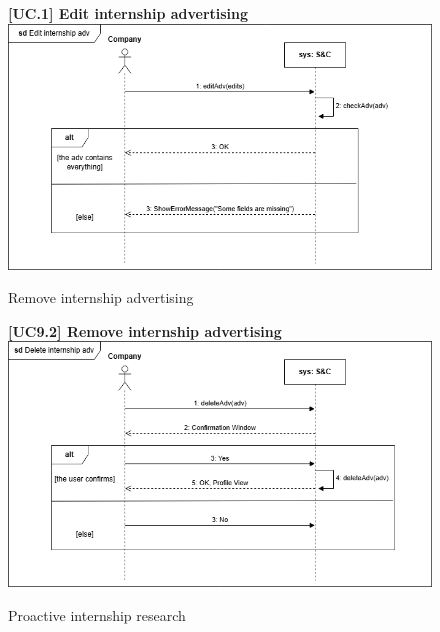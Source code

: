 \begin{figure}[H]
\textbf{[UC\nextUCDiagr.1] Edit internship advertising}\newline\newline
\includegraphics[width=15cm]{Images/UC_diagram/RASD-UC9.drawio.png}
    \caption{Remove internship advertising}
\end{figure}

\begin{figure}[H]
\textbf{[UC9.2] Remove internship advertising}\newline\newline
\includegraphics[width=15cm]{Images/UC_diagram/RASD-UC10.drawio.png}
    \caption{Proactive internship research}
\end{figure}

